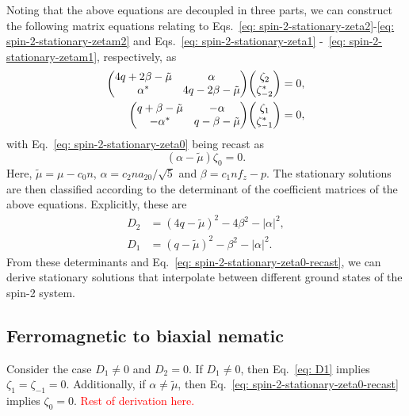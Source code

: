 Noting that the above equations are decoupled in three parts, we can construct
the following matrix equations relating to
Eqs.~\eqref{eq: spin-2-stationary-zeta2}-\eqref{eq: spin-2-stationary-zetam2}
and Eqs.~\eqref{eq: spin-2-stationary-zeta1}
-~\eqref{eq: spin-2-stationary-zetam1}, respectively, as
\begin{align}
    \mqty(4q + 2\beta -\tilde{\mu} & \alpha                           \\
    \alpha^*                       & 4q - 2\beta -\tilde{\mu})
    \mqty(\zeta_2                                                     \\
    \zeta_{-2}^*)                  & = 0, \label{eq: zeta-pm2-matrix} \\
    \mqty(q + \beta -\tilde{\mu}   & -\alpha                          \\
    -\alpha^*                      & q - \beta -\tilde{\mu})
    \mqty(\zeta_1                                                     \\
    \zeta_{-1}^*)                  & = 0, \label{eq: zeta-pm1-matrix}
\end{align}
with Eq.~\eqref{eq: spin-2-stationary-zeta0} being recast as
\begin{equation}\label{eq: spin-2-stationary-zeta0-recast}
    (\alpha - \tilde{\mu})\zeta_0 = 0.
\end{equation}
Here, \(\tilde{\mu} = \mu - c_0n\), \(\alpha = c_2na_{20}/\sqrt{5}\) and
\(\beta = c_1nf_z - p\).
The stationary solutions are then classified according to the determinant of
the coefficient matrices of the above equations.
Explicitly, these are
\begin{align}
    D_2 & = {(4q-\tilde{\mu})}^2 -4\beta^2 - |\alpha|^2, \label{eq: D2}  \\
    D_1 & = {(q - \tilde{\mu})}^2 - \beta^2 - |\alpha|^2. \label{eq: D1}
\end{align}
From these determinants and Eq.~\eqref{eq: spin-2-stationary-zeta0-recast},
we can derive stationary solutions that interpolate between different ground
states of the spin-2 system.

\subsection{Ferromagnetic to biaxial nematic}
Consider the case \(D_1 \neq 0\) and \(D_2 = 0\).
If \(D_1 \neq 0\), then Eq.~\eqref{eq: D1} implies \(\zeta_1=\zeta_{-1} = 0\).
Additionally, if \(\alpha \neq \tilde{\mu}\),
then Eq.~\eqref{eq: spin-2-stationary-zeta0-recast} implies \(\zeta_0 = 0\).
\textcolor{red}{Rest of derivation here.}

